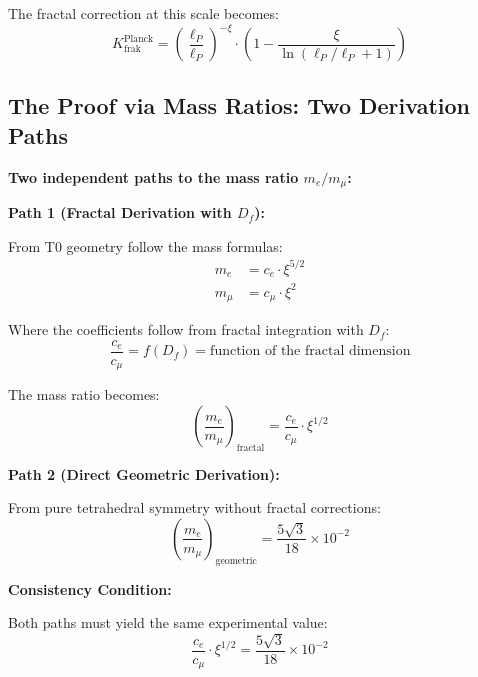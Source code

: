 	The fractal correction at this scale becomes:
	\begin{equation}
		K_{\text{frak}}^{\text{Planck}} = \left(\frac{\ell_P}{\ell_P}\right)^{-\xi} \cdot \left(1 - \frac{\xi}{\ln(\ell_P/\ell_P + 1)}\right)
	\end{equation}
	
	\subsection{The Proof via Mass Ratios: Two Derivation Paths}
	
	\begin{tcolorbox}[colback=red!5!white,colframe=red!75!black,title={Unique Determination of $K_{\text{frak}}$ and $D_f$}]
		\textbf{Two independent paths to the mass ratio $m_e/m_\mu$:}
		
		\textbf{Path 1 (Fractal Derivation with $D_f$):}
		
		From T0 geometry follow the mass formulas:
		\begin{align}
			m_e &= c_e \cdot \xi^{5/2} \\
			m_\mu &= c_\mu \cdot \xi^2
		\end{align}
		
		Where the coefficients follow from fractal integration with $D_f$:
		\begin{equation}
			\frac{c_e}{c_\mu} = f(D_f) = \text{function of the fractal dimension}
		\end{equation}
		
		The mass ratio becomes:
		\begin{equation}
			\left(\frac{m_e}{m_\mu}\right)_{\text{fractal}} = \frac{c_e}{c_\mu} \cdot \xi^{1/2}
		\end{equation}
		
		\textbf{Path 2 (Direct Geometric Derivation):}
		
		From pure tetrahedral symmetry without fractal corrections:
		\begin{equation}
			\left(\frac{m_e}{m_\mu}\right)_{\text{geometric}} = \frac{5\sqrt{3}}{18} \times 10^{-2}
		\end{equation}
		
		\textbf{Consistency Condition:}
		
		Both paths must yield the same experimental value:
		\begin{equation}
			\frac{c_e}{c_\mu} \cdot \xi^{1/2} = \frac{5\sqrt{3}}{18} \times 10^{-2}
		\end{equation}
		

\end{tcolorbox}
